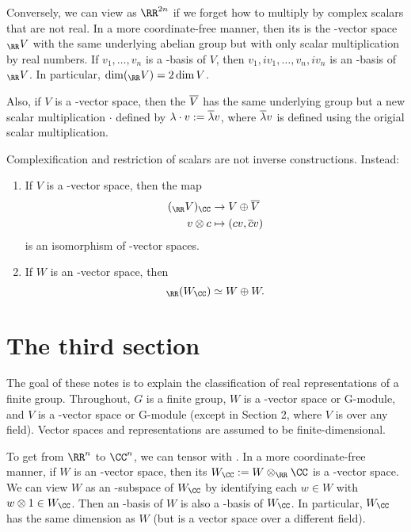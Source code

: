 \documentclass{scrartcl}
\begin{document}
Conversely, we can view \CC[n] as $\RR^{2n}$ if we forget how to multiply by complex scalars that are not real. In a more coordinate-free manner, then its  is the \RR-vector space $_{\RR} V$ with the same underlying abelian group but with only scalar multiplication by real numbers. If $v_1,\dots,v_n$ is a \CC-basis of $V$, then $v_1, iv_1,\dots,v_n,iv_n$ is an \RR-basis of $_{\RR} V$. In particular, $\dim(_{\RR} V) = 2\dim V$.

Also, if $V$ is a \CC-vector space, then the  $\overline{V}$ has the same underlying group but a new scalar multiplication $\cdot$ defined by $\lambda\cdot v := \overline{\lambda}v$, where $\overline{\lambda}v$ is defined using the origial scalar multiplication.

Complexification and restriction of scalars are not inverse constructions. Instead:
\begin{proposition}
    \hfill
    \begin{enumerate}[font=\normalfont]
        \item If $V$ is a \CC-vector space, then the map \begin{align*}
            (_{\RR} V)_{\CC} &\rightarrow V \oplus \ol{V} \\
            v\otimes c &\mapsto (cv,\ol{c}v) \\
        \end{align*} is an isomorphism of \CC-vector spaces.
        \item If $W$ is an \RR-vector space, then \[_{\RR}(W_{\CC}) \simeq W\oplus W.\]
    \end{enumerate}
\end{proposition}

\section{The third section}


The goal of these notes is to explain the classification of real representations of a finite
group. Throughout, $G$ is a finite group, $W$ is a \RR-vector space or \RR G-module, and $V$ is a
\CC-vector space or \CC G-module (except in Section 2, where $V$ is over any field). Vector spaces
and representations are assumed to be finite-dimensional.

To get from $\RR^n$ to $\CC^n$, we can tensor with \CC. In a more coordinate-free
manner, if $W$ is an \RR-vector space, then its  $W_{\CC} := W \otimes_{\RR} \CC$ is a \CC-vector
space. We can view $W$ as an \RR-subspace of $W_{\CC}$ by identifying each $w \in W$ with $w \otimes 1 \in W_{\CC}$.
Then an \RR-basis of $W$ is also a \CC-basis of $W_{\CC}$. In particular, $W_{\CC}$ has the same dimension as
$W$ (but is a vector space over a different field).
\end{document}
